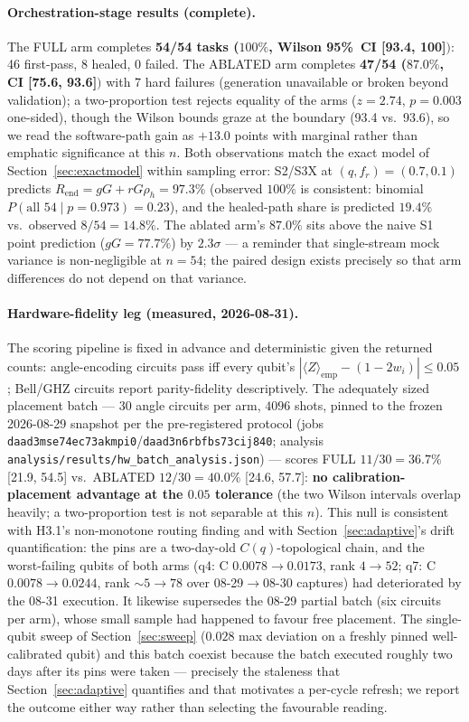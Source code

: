﻿\documentclass[12pt,a4paper]{article}
\begin{document}
\paragraph{Orchestration-stage results (complete).} The FULL arm completes \textbf{54/54 tasks ($100\%$, Wilson 95\%~CI [93.4, 100]$)$}: 46 first-pass, 8 healed, 0 failed. The ABLATED arm completes \textbf{47/54 ($87.0\%$, CI [75.6, 93.6]$)$} with 7 hard failures (generation unavailable or broken beyond validation); a two-proportion test rejects equality of the arms ($z = 2.74$, $p = 0.003$ one-sided), though the Wilson bounds graze at the boundary (93.4 vs.\ 93.6), so we read the software-path gain as $+13.0$ points with marginal rather than emphatic significance at this $n$. Both observations match the exact model of Section~\ref{sec:exactmodel} within sampling error: S2/S3X at $(q, f_r) = (0.7, 0.1)$ predicts $R_{\mathrm{end}} = gG + rG\rho_h = 97.3\%$ (observed $100\%$ is consistent: binomial $P(\text{all } 54 \mid p{=}0.973) = 0.23$), and the healed-path share is predicted $19.4\%$ vs.\ observed $8/54 = 14.8\%$. The ablated arm's $87.0\%$ sits above the naive S1 point prediction ($gG = 77.7\%$) by $2.3\sigma$ --- a reminder that single-stream mock variance is non-negligible at $n{=}54$; the paired design exists precisely so that arm differences do not depend on that variance.

\paragraph{Hardware-fidelity leg (measured, 2026-08-31).} The scoring pipeline is fixed in advance and deterministic given the returned counts: angle-encoding circuits pass iff every qubit's $|\langle Z\rangle_{\mathrm{emp}} - (1 - 2w_i)| \le 0.05$; Bell/GHZ circuits report parity-fidelity descriptively. The adequately sized placement batch --- 30 angle circuits per arm, $4096$ shots, pinned to the frozen 2026-08-29 snapshot per the pre-registered protocol (jobs \texttt{daad3mse74ec73akmpi0}/\texttt{daad3n6rbfbs73cij840}; analysis \texttt{analysis/results/hw\_batch\_analysis.json}) --- scores FULL $11/30 = 36.7\%$ [21.9, 54.5] vs.\ ABLATED $12/30 = 40.0\%$ [24.6, 57.7]: \textbf{no calibration-placement advantage at the $0.05$ tolerance} (the two Wilson intervals overlap heavily; a two-proportion test is not separable at this $n$). This null is consistent with H3.1's non-monotone routing finding and with Section~\ref{sec:adaptive}'s drift quantification: the pins are a two-day-old $C(q)$-topological chain, and the worst-failing qubits of both arms (q4: C $0.0078\to0.0173$, rank $4\to52$; q7: C $0.0078\to0.0244$, rank $\sim 5\to78$ over 08-29$\to$08-30 captures) had deteriorated by the 08-31 execution. It likewise supersedes the 08-29 partial batch (six circuits per arm), whose small sample had happened to favour free placement. The single-qubit sweep of Section~\ref{sec:sweep} ($0.028$ max deviation on a freshly pinned well-calibrated qubit) and this batch coexist because the batch executed roughly two days after its pins were taken --- precisely the staleness that Section~\ref{sec:adaptive} quantifies and that motivates a per-cycle refresh; we report the outcome either way rather than selecting the favourable reading.
\end{document}
